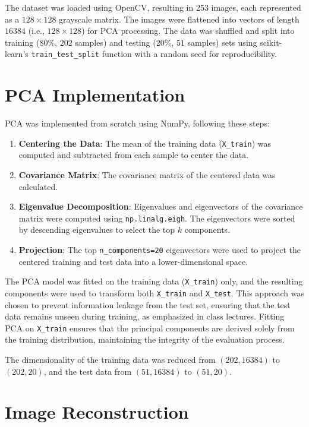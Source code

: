 \documentclass{article}
\begin{document}
The dataset was loaded using OpenCV, resulting in 253 images, each represented as a $128 \times 128$ grayscale matrix. The images were flattened into vectors of length $16384$ (i.e., $128 \times 128$) for PCA processing. The data was shuffled and split into training ($80\%$, $202$ samples) and testing ($20\%$, $51$ samples) sets using scikit-learn's \texttt{train\_test\_split} function with a random seed for reproducibility.

\section*{PCA Implementation}

PCA was implemented from scratch using NumPy, following these steps:

\begin{enumerate}
    \item \textbf{Centering the Data}: The mean of the training data (\texttt{X\_train}) was computed and subtracted from each sample to center the data.
    \item \textbf{Covariance Matrix}: The covariance matrix of the centered data was calculated.
    \item \textbf{Eigenvalue Decomposition}: Eigenvalues and eigenvectors of the covariance matrix were computed using \texttt{np.linalg.eigh}. The eigenvectors were sorted by descending eigenvalues to select the top $k$ components.
    \item \textbf{Projection}: The top \texttt{n\_components=20} eigenvectors were used to project the centered training and test data into a lower-dimensional space.
\end{enumerate}

The PCA model was fitted on the training data (\texttt{X\_train}) only, and the resulting components were used to transform both \texttt{X\_train} and \texttt{X\_test}. This approach was chosen to prevent information leakage from the test set, ensuring that the test data remains unseen during training, as emphasized in class lectures. Fitting PCA on \texttt{X\_train} ensures that the principal components are derived solely from the training distribution, maintaining the integrity of the evaluation process.

The dimensionality of the training data was reduced from $(202, 16384)$ to $(202, 20)$, and the test data from $(51, 16384)$ to $(51, 20)$.

\section*{Image Reconstruction}
\end{document}
